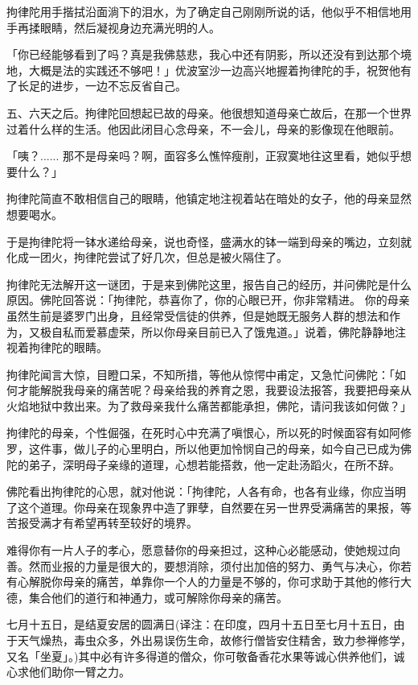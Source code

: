 \documentclass[twoside,openany]{book}
\begin{document}
拘律陀用手揩拭沿面淌下的泪水，为了确定自己刚刚所说的话，他似乎不相信地用手再揉眼睛，然后凝视身边充满光明的人。

「你已经能够看到了吗？真是我佛慈悲，我心中还有阴影，所以还没有到达那个境地，大概是法的实践还不够吧！」优波室沙一边高兴地握着拘律陀的手，祝贺他有了长足的进步，一边不忘反省自己。

五、六天之后。拘律陀回想起已故的母亲。他很想知道母亲亡故后，在那一个世界过着什么样的生活。他因此闭目心念母亲，不一会儿，母亲的影像现在他眼前。

「咦？......	那不是母亲吗？啊，面容多么憔悴瘦削，正寂寞地往这里看，她似乎想要什么？」

拘律陀简直不敢相信自己的眼睛，他镇定地注视着站在暗处的女子，他的母亲显然想要喝水。

于是拘律陀将一钵水递给母亲，说也奇怪，盛满水的钵一端到母亲的嘴边，立刻就化成一团火，拘律陀尝试了好几次，但总是被火隔住了。

拘律陀无法解开这一谜团，于是来到佛陀这里，报告自己的经历，并问佛陀是什么原因。佛陀回答说：「拘律陀，恭喜你了，你的心眼已开，你非常精进。  你的母亲虽然生前是婆罗门出身，且经常受信徒的供养，但是她既无服务人群的想法和作为，又极自私而爱慕虚荣，所以你母亲目前已入了饿鬼道。」说着，佛陀静静地注视着拘律陀的眼睛。

拘律陀闻言大惊，目瞪口呆，不知所措，等他从惊愕中甫定，又急忙问佛陀：「如何才能解脱我母亲的痛苦呢？母亲给我的养育之恩，我要设法报答，我要把母亲从火焰地狱中救出来。为了救母亲我什么痛苦都能承担，佛陀，请问我该如何做？」

拘律陀的母亲，个性倔强，在死时心中充满了嗔恨心，所以死的时候面容有如阿修罗，这件事，做儿子的心里明白，所以他更加怜悯自己的母亲，如今自己已成为佛陀的弟子，深明母子亲缘的道理，心想若能搭救，他一定赴汤蹈火，在所不辞。

佛陀看出拘律陀的心思，就对他说：「拘律陀，人各有命，也各有业缘，你应当明了这个道理。你母亲在现象界中造了罪孽，自然要在另一世界受满痛苦的果报，等苦报受满才有希望再转至较好的境界。

难得你有一片人子的孝心，愿意替你的母亲担过，这种心必能感动，使她规过向善。然而业报的力量是很大的，要想消除，须付出加倍的努力、勇气与决心，你若有心解脱你母亲的痛苦，单靠你一个人的力量是不够的，你可求助于其他的修行大德，集合他们的道行和神通力，或可解除你母亲的痛苦。

七月十五日，是结夏安居的圆满日({\kaishu 译注：在印度，四月十五日至七月十五日，由于天气燥热，毒虫众多，外出易误伤生命，故修行僧皆安住精舍，致力参禅修学，又名「坐夏」。})其中必有许多得道的僧众，你可敬备香花水果等诚心供养他们，诚心求他们助你一臂之力。
\end{document}
